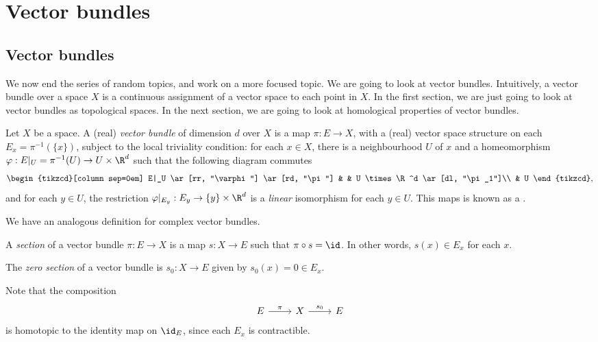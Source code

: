 \documentclass[a4paper]{article}
\theoremstyle{definition}
\begin{document}
\section{Vector bundles}
\subsection{Vector bundles}
We now end the series of random topics, and work on a more focused topic. We are going to look at vector bundles. Intuitively, a vector bundle over a space $X$ is a continuous assignment of a vector space to each point in $X$. In the first section, we are just going to look at vector bundles as topological spaces. In the next section, we are going to look at homological properties of vector bundles.

\begin{defi}
  Let $X$ be a space. A (real) \emph{vector bundle} of dimension $d$ over $X$ is a map $\pi:E \to X$, with a (real) vector space structure on each  $E_x = \pi^{-1}(\{x\})$, subject to the local triviality condition: for each $x \in X$, there is a neighbourhood $U$ of $x$ and a homeomorphism $\varphi:E|_U = \pi^{-1}(U) \to U \times \R^d$ such that the following diagram commutes
  \[
    \begin{tikzcd}[column sep=0em]
      E|_U \ar[rr, "\varphi"] \ar[rd, "\pi"] & & U \times \R^d \ar[dl, "\pi_1"]\\
      & U
    \end{tikzcd},
  \]
  and for each $y \in U$, the restriction $\varphi|_{E_y}: E_y \to \{y\} \times \R^d$ is a \emph{linear} isomorphism for each $y \in U$. This maps is known as a .
\end{defi}
We have an analogous definition for complex vector bundles.

\begin{defi}[Section]
  A \emph{section} of a vector bundle $\pi: E \to X$ is a map $s: X \to E$ such that $\pi \circ s = \id$. In other words, $s(x) \in E_x$ for each $x$.
\end{defi}

\begin{defi}
  The \emph{zero section} of a vector bundle is $s_0: X \to E$ given by $s_0(x) = 0 \in E_x$.
\end{defi}

Note that the composition
\[
  \begin{tikzcd}
    E \ar[r, "\pi"] & X \ar[r, "s_0"] & E
  \end{tikzcd}
\]
is homotopic to the identity map on $\id_E$, since each $E_x$ is contractible.
\end{document}
